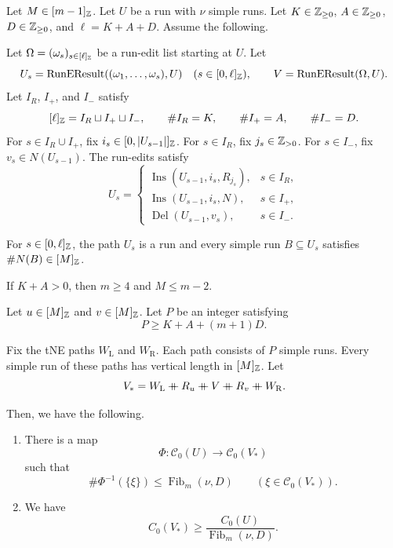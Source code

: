 \begin{proposition}\label{prop:composition}
Let $M\in[m-1]_{\mathbb Z}$.
Let $U$ be a run with $\nu$ simple runs.
Let $K\in\mathbb Z_{\ge0}$, $A\in\mathbb Z_{\ge0}$, $D\in\mathbb Z_{\ge0}$, and $\ell=K+A+D$.
Assume the following.
\begin{hypotheses}
\item\label{hyp:comparison-edit-list} Let $\Omega=(\omega_s)_{s\in[\ell]_{\mathbb Z}}$ be a run-edit list starting at $U$.
Let
\[
 U_s=\operatorname{RunEResult}((\omega_1,\ldots,\omega_s),U)
 \quad(s\in[0,\ell]_{\mathbb Z}),\qquad V=\operatorname{RunEResult}(\Omega,U).
\]
Let $I_R$, $I_+$, and $I_-$ satisfy
\[
 [\ell]_{\mathbb Z}=I_R\sqcup I_+\sqcup I_-,\qquad \#I_R=K,\qquad \#I_+=A,\qquad \#I_-=D.
\]
For $s\in I_R\cup I_+$, fix $i_s\in[0,|U_{s-1}|]_{\mathbb Z}$.
For $s\in I_R$, fix $j_s\in\mathbb Z_{>0}$.
For $s\in I_-$, fix $v_s\in N(U_{s-1})$.
The run-edits satisfy
\[
 U_s=
 \begin{cases}
 \operatorname{Ins}(U_{s-1},i_s,R_{j_s}),&s\in I_R,\\
 \operatorname{Ins}(U_{s-1},i_s,N),&s\in I_+,\\
 \operatorname{Del}(U_{s-1},v_s),&s\in I_-.
 \end{cases}
\]
\item\label{hyp:comparison-run-lengths} For $s\in[0,\ell]_{\mathbb Z}$, the path $U_s$ is a run
and every simple run $B\subseteq U_s$ satisfies $\#N(B)\in[M]_{\mathbb Z}$.
\item\label{hyp:comparison-insertion-range} If $K+A>0$, then
$m\ge4$ and $M\le m-2$.
\item\label{hyp:comparison-shell-budget} Let $u\in[M]_{\mathbb Z}$ and $v\in[M]_{\mathbb Z}$.
Let $P$ be an integer satisfying
\begin{equation}\label{eq:layer-budget}
 P\ge K+A+(m+1)D.
\end{equation}
\item\label{hyp:comparison-target} Fix the tNE paths $W_{\mathrm L}$ and $W_{\mathrm R}$. Each path consists of $P$ simple runs.
Every simple run of these paths has vertical length in $[M]_{\mathbb Z}$.
Let
\begin{equation}\label{eq:target-shape}
 V_*=W_{\mathrm L}\ccn R_u\ccn V\ccn R_v\ccn W_{\mathrm R}.
\end{equation}
\end{hypotheses}
Then, we have the following.

\begin{enumerate}
\item\label{c:composition-target} There is a map
\[
 \Phi\colon\mathcal C_0(U)\longrightarrow\mathcal C_0(V_*)
\]
such that
\[
 \#\Phi^{-1}(\{\xi\})\le \operatorname{Fib}_m(\nu,D)
 \qquad(\xi\in\mathcal C_0(V_*)).
\]
\item\label{c:composition-bound} We have
\begin{equation}\label{eq:composition}
 C_0(V_*)\ge\frac{C_0(U)}{\operatorname{Fib}_m(\nu,D)}.
\end{equation}
\end{enumerate}
\end{proposition}
